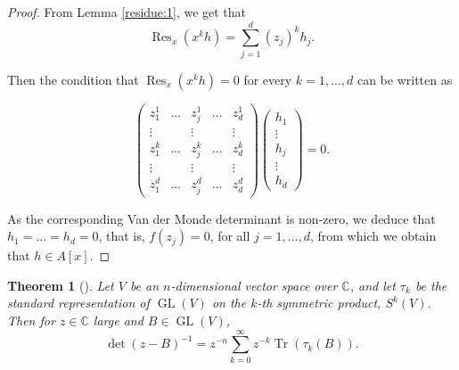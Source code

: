 \documentclass{article}
\newtheorem{theorem}{Theorem}[section]
\newcommand{\CC}{\mathbb{C}}
\DeclareMathOperator{\Tr}{Tr}
\DeclareMathOperator{\Res}{Res}
\DeclareMathOperator{\GL}{GL}
\begin{document}
	\begin{proof}
		From Lemma \ref{residue:1}, we get that
		\begin{equation*}
			\Res_{x}(x^{k}h) = \sum_{j = 1}^{d} (z_{j})^{k} h_{j}.
		\end{equation*}
		
		Then the condition that $\Res_{x}(x^{k}h) = 0$ for every $k = 1, \ldots, d$ can be written as
		
		\begin{equation*}
			\begin{pmatrix}
				z_{1}^{1} & \ldots & z_{j}^{1} & \ldots & z_{d}^{1} \\
				\vdots & & \vdots & & \vdots \\
				z_{1}^{k} & \ldots & z_{j}^{k} & \ldots & z_{d}^{k} \\
				\vdots & & \vdots & & \vdots \\
				z_{1}^{d} & \ldots & z_{j}^{d} & \ldots & z_{d}^{d}
			\end{pmatrix}
			\begin{pmatrix}
				h_{1} \\ \vdots \\ h_{j} \\ \vdots \\ h_{d}
			\end{pmatrix}
			= 0.
		\end{equation*}
	
		As the corresponding Van der Monde determinant is non-zero, we deduce that $h_{1} = \ldots = h_{d} = 0$, that is, $f(z_{j}) = 0$, for all $j = 1, \ldots, d$, from which we obtain that $h \in A[x]$.
	\end{proof}
	
	\begin{theorem}[\cite{CanasdaSilva1996}]\label{residue:3}
		Let $V$ be an $n$-dimensional vector space over $\CC$, and let $\tau_{k}$ be the standard representation of $\GL(V)$ on the $k$-th symmetric product, $S^{k}(V)$. Then for $z \in \CC$ large and $B \in \GL(V)$,
		\begin{equation*}
			\det(z - B)^{-1} = z^{-n}\sum\limits_{k=0}^{\infty} z^{-k} \Tr(\tau_{k}(B)).
		\end{equation*}
	\end{theorem}
\end{document}
